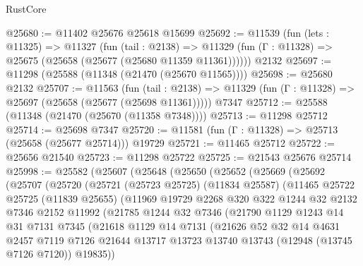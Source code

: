 \begin{lexlean}{RustCore}
\begin{coremodule}
@25680 := @11402 @25676 @25618 @15699
@25692 := @11539
    (fun (lets : @11325) =>
    @11327
      (fun (tail : @2138) =>
      @11329 (fun (Γ : @11328) => @25675 (@25658 (@25677 (@25680 @11359 @11361))))))
    @2132
@25697 := @11298 (@25588 (@11348 (@21470 (@25670 @11565))))
@25698 := @25680 @2132
@25707 := @11563
    (fun (tail : @2138) => @11329 (fun (Γ : @11328) => @25697 (@25658 (@25677 (@25698 @11361)))))
    @7347
@25712 := @25588 (@11348 (@21470 (@25670 (@11358 @7348))))
@25713 := @11298 @25712
@25714 := @25698 @7347
@25720 := @11581 (fun (Γ : @11328) => @25713 (@25658 (@25677 @25714))) @19729
@25721 := @11465 @25712
@25722 := @25656 @21540
@25723 := @11298 @25722
@25725 := @21543 @25676 @25714
@25998 := @25582
    (@25607
      (@25648
        (@25650
          (@25652
            (@25669
              (@25692
                (@25707
                  (@25720
                    (@25721
                      (@25723 @25725)
                      (@11834 @25587)
                      (@11465
                        @25722
                        @25725
                        (@11839 @25655)
                        (@11969
                          @19729
                          @2268
                          @320
                          @322
                          @1244
                          @32
                          @2132
                          @7346
                          @2152
                          @11992
                          (@21785
                            @1244
                            @32
                            @7346
                            (@21790
                              @1129
                              @1243
                              @14
                              @31
                              @7131
                              @7345
                              (@21618
                                @1129
                                @14
                                @7131
                                (@21626
                                  @52
                                  @32
                                  @14
                                  @4631
                                  @2457
                                  @7119
                                  @7126
                                  @21644
                                  @13717
                                  @13723
                                  @13740
                                  @13743
                                  (@12948 (@13745 @7126 @7120))
                                  @19835))

\end{coremodule}
\end{lexlean}

